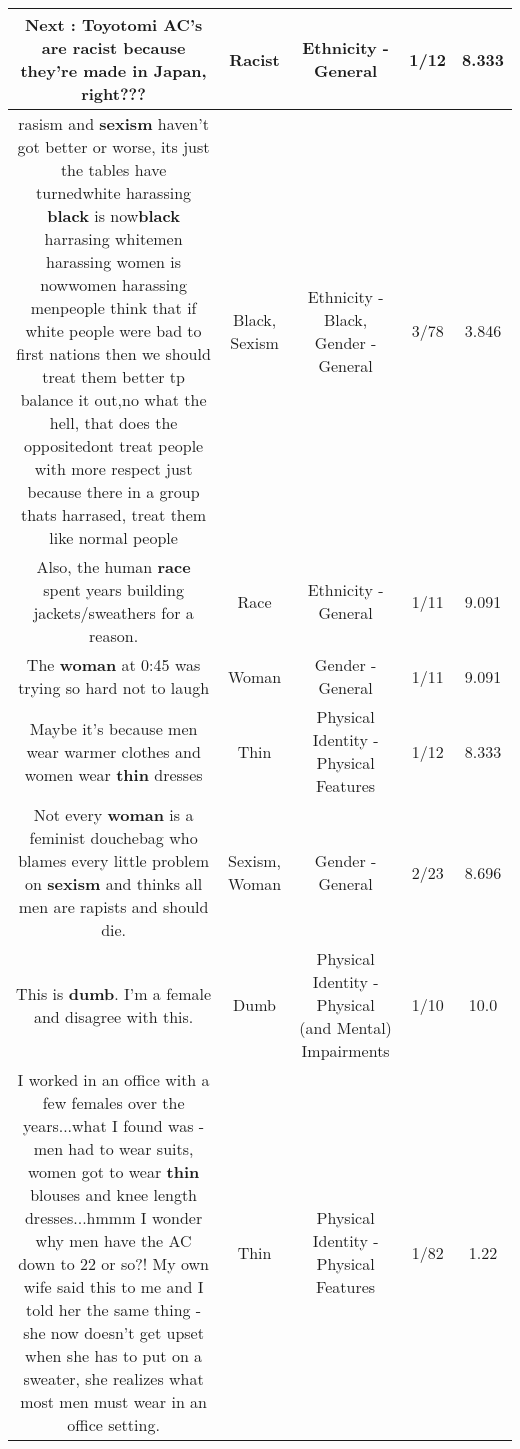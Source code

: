 \documentclass[11pt]{article}
\newlength\mylength
\begin{document}
\begin{center}
\begin{longtable}{|C{.65\mylength}|C{.30\mylength}|C{.12\mylength}|C{.12\mylength}|C{.12\mylength}|}
  \small Next : Toyotomi AC's are \textbf{racist} because they're made in Japan, right???\normalsize   & Racist & Ethnicity - General & 1/12 & 8.333 \\  \hline
  \small rasism and \textbf{sexism} haven't got better or worse, its just the tables have turnedwhite harassing \textbf{black} is now\textbf{black} harrasing whitemen harassing women is nowwomen harassing menpeople think that if white people were bad to first nations then we should treat them better tp balance it out,no what the hell, that does the oppositedont treat people with more respect just because there in a group thats harrased, treat them like normal people\normalsize   & Black, Sexism & Ethnicity - Black, Gender - General & 3/78 & 3.846 \\  \hline
  \small Also, the human \textbf{race} spent years building jackets/sweathers for a reason.\normalsize   & Race & Ethnicity - General & 1/11 & 9.091 \\  \hline
  \small The \textbf{woman} at 0:45 was trying so hard not to laugh\normalsize   & Woman & Gender - General & 1/11 & 9.091 \\  \hline
  \small Maybe it's because men wear warmer clothes and women wear \textbf{thin} dresses\normalsize   & Thin & Physical Identity - Physical Features & 1/12 & 8.333 \\  \hline
  \small Not every \textbf{woman} is a feminist douchebag who blames every little problem on \textbf{sexism} and thinks all men are rapists and should die.\normalsize   & Sexism, Woman & Gender - General & 2/23 & 8.696 \\  \hline
  \small This is \textbf{dumb}. I'm a female and disagree with this.\normalsize   & Dumb & Physical Identity - Physical (and Mental) Impairments & 1/10 & 10.0 \\  \hline
  \small I worked in an office with a few females over the years...what I found was - men had to wear suits, women got to wear \textbf{thin} blouses and knee length dresses...hmmm I wonder why men have the AC down to 22 or so?! My own wife said this to me and I told her the same thing - she now doesn't get upset when she has to put on a sweater, she realizes what most men must wear in an office setting.\normalsize   & Thin & Physical Identity - Physical Features & 1/82 & 1.22 \\  \hline

\end{longtable}
\end{center}
\end{document}
